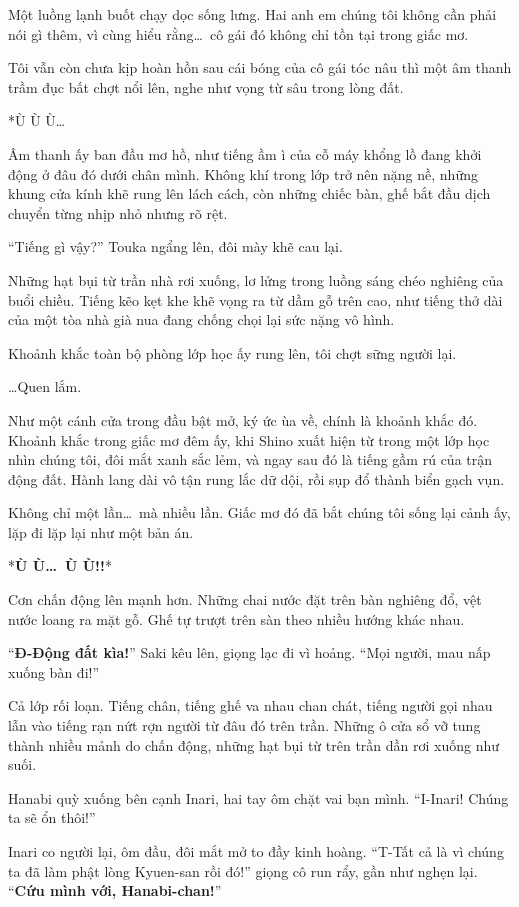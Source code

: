 \documentclass[../main.tex]{subfiles}
\begin{document}
Một luồng lạnh buốt chạy dọc sống lưng. Hai anh em chúng tôi không cần phải nói gì thêm, vì cùng hiểu rằng\dots\ cô gái đó không chỉ tồn tại trong giấc mơ.

Tôi vẫn còn chưa kịp hoàn hồn sau cái bóng của cô gái tóc nâu thì một âm thanh trầm đục bất chợt nổi lên, nghe như vọng từ sâu trong lòng đất.

*Ù Ù Ù\dots*

Âm thanh ấy ban đầu mơ hồ, như tiếng ầm ì của cỗ máy khổng lồ đang khởi động ở đâu đó dưới chân mình. Không khí trong lớp trở nên nặng nề, những khung cửa kính khẽ rung lên lách cách, còn những chiếc bàn, ghế bắt đầu dịch chuyển từng nhịp nhỏ nhưng rõ rệt.

``Tiếng gì vậy?'' Touka ngẩng lên, đôi mày khẽ cau lại.

Những hạt bụi từ trần nhà rơi xuống, lơ lửng trong luồng sáng chéo nghiêng của buổi chiều. Tiếng kẽo kẹt khe khẽ vọng ra từ dầm gỗ trên cao, như tiếng thở dài của một tòa nhà già nua đang chống chọi lại sức nặng vô hình.

Khoảnh khắc toàn bộ phòng lớp học ấy rung lên, tôi chợt sững người lại.

\dots Quen lắm.

Như một cánh cửa trong đầu bật mở, ký ức ùa về, chính là khoảnh khắc đó. Khoảnh khắc trong giấc mơ đêm ấy, khi Shino xuất hiện từ trong một lớp học nhìn chúng tôi, đôi mắt xanh sắc lẻm, và ngay sau đó là tiếng gầm rú của trận động đất. Hành lang dài vô tận rung lắc dữ dội, rồi sụp đổ thành biển gạch vụn.

Không chỉ một lần\dots\ mà nhiều lần. Giấc mơ đó đã bắt chúng tôi sống lại cảnh ấy, lặp đi lặp lại như một bản án.

*\textbf{Ù Ù\dots\ Ù Ù!!}*

Cơn chấn động lên mạnh hơn. Những chai nước đặt trên bàn nghiêng đổ, vệt nước loang ra mặt gỗ. Ghế tự trượt trên sàn theo nhiều hướng khác nhau.

``\textbf{Đ-Động đất kìa!}'' Saki kêu lên, giọng lạc đi vì hoảng. ``Mọi người, mau nấp xuống bàn đi!''

Cả lớp rối loạn. Tiếng chân, tiếng ghế va nhau chan chát, tiếng người gọi nhau lẫn vào tiếng rạn nứt rợn người từ đâu đó trên trần. Những ô cửa sổ vỡ tung thành nhiều mảnh do chấn động, những hạt bụi từ trên trần dần rơi xuống như suối.

Hanabi quỳ xuống bên cạnh Inari, hai tay ôm chặt vai bạn mình. ``I-Inari! Chúng ta sẽ ổn thôi!''

Inari co người lại, ôm đầu, đôi mắt mở to đầy kinh hoàng. ``T-Tất cả là vì chúng ta đã làm phật lòng Kyuen-san rồi đó!'' giọng cô run rẩy, gần như nghẹn lại. ``\textbf{Cứu mình với, Hanabi-chan!}''
\end{document}
